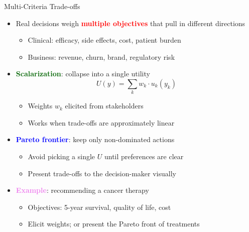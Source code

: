 \documentclass[
  10pt,
  ignorenonframetext,
]{beamer}
\providecommand{\tightlist}{%
  \setlength{\itemsep}{0pt}\setlength{\parskip}{0pt}}
\begin{document}
\begin{frame}{Multi-Criteria Trade-offs}
\label{multi-criteria-trade-offs}
\begin{itemize}
\tightlist
\item
  Real decisions weigh \textbf{\textcolor{red}{multiple objectives}}
  that pull in different directions

  \begin{itemize}
  \tightlist
  \item
    Clinical: efficacy, side effects, cost, patient burden
  \item
    Business: revenue, churn, brand, regulatory risk
  \end{itemize}
\item
  \textbf{\textcolor{darkgreen}{Scalarization}}: collapse into a single
  utility \[
  U(y) = \sum_{k} w_k \cdot u_k(y_k)
  \]

  \begin{itemize}
  \tightlist
  \item
    Weights \(w_k\) elicited from stakeholders
  \item
    Works when trade-offs are approximately linear
  \end{itemize}
\item
  \textbf{\textcolor{blue}{Pareto frontier}}: keep only non-dominated
  actions

  \begin{itemize}
  \tightlist
  \item
    Avoid picking a single \(U\) until preferences are clear
  \item
    Present trade-offs to the decision-maker visually
  \end{itemize}
\item
  \textbf{\textcolor{violet}{Example}}: recommending a cancer therapy

  \begin{itemize}
  \tightlist
  \item
    Objectives: 5-year survival, quality of life, cost
  \item
    Elicit weights; or present the Pareto front of treatments
  \end{itemize}
\end{itemize}
\end{frame}
\end{document}
